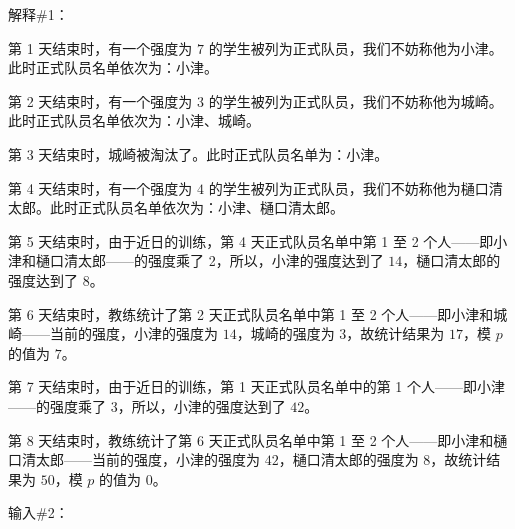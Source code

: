 解释\#1：

第 1 天结束时，有一个强度为 $7$ 的学生被列为正式队员，我们不妨称他为小津。此时正式队员名单依次为：小津。

第 2 天结束时，有一个强度为 $3$ 的学生被列为正式队员，我们不妨称他为城崎。此时正式队员名单依次为：小津、城崎。

第 3 天结束时，城崎被淘汰了。此时正式队员名单为：小津。

第 4 天结束时，有一个强度为 $4$ 的学生被列为正式队员，我们不妨称他为樋口清太郎。此时正式队员名单依次为：小津、樋口清太郎。

第 5 天结束时，由于近日的训练，第 4 天正式队员名单中第 1 至 2 个人——即小津和樋口清太郎——的强度乘了 2，所以，小津的强度达到了 $14$，樋口清太郎的强度达到了 $8$。

第 6 天结束时，教练统计了第 2 天正式队员名单中第 1 至 2 个人——即小津和城崎——当前的强度，小津的强度为 $14$，城崎的强度为 $3$，故统计结果为 $17$，模 $p$ 的值为 $7$。

第 7 天结束时，由于近日的训练，第 1 天正式队员名单中的第 1 个人——即小津——的强度乘了 3，所以，小津的强度达到了 $42$。

第 8 天结束时，教练统计了第 6 天正式队员名单中第 1 至 2 个人——即小津和樋口清太郎——当前的强度，小津的强度为 $42$，樋口清太郎的强度为 $8$，故统计结果为 $50$，模 $p$ 的值为 $0$。

输入\#2：

